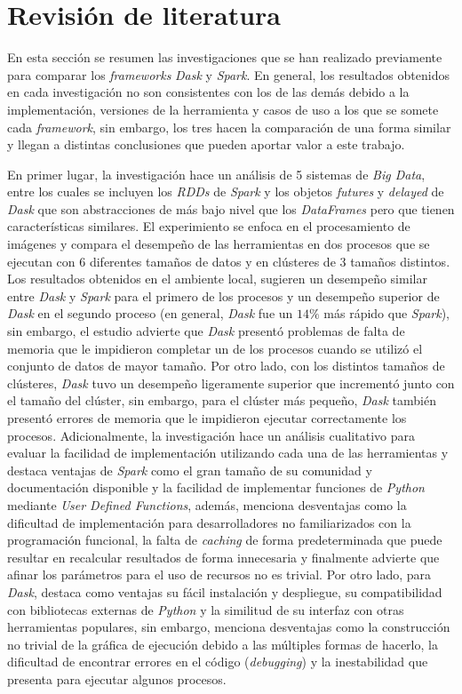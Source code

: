 \chapter{Revisión de literatura}

\noindent En esta sección se resumen las investigaciones que se han realizado previamente para comparar los \textit{frameworks} \textit{Dask} y \textit{Spark}. En general, los resultados obtenidos en cada investigación no son consistentes con los de las demás debido a la implementación, versiones de la herramienta y casos de uso a los que se somete cada \textit{framework}, sin embargo, los tres hacen la comparación de una forma similar y llegan a distintas conclusiones que pueden aportar valor a este trabajo.

En primer lugar, la investigación \cite{comparative-evolution} hace un análisis de 5 sistemas de \textit{Big Data}, entre los cuales se incluyen los \textit{RDDs} de \textit{Spark} y los objetos \textit{futures} y \textit{delayed} de \textit{Dask} que son abstracciones de más bajo nivel que los \textit{DataFrames} pero que tienen características similares. El experimiento se enfoca en el procesamiento de imágenes y compara el desempeño de las herramientas en dos procesos que se ejecutan con 6 diferentes tamaños de datos y en clústeres de 3 tamaños distintos. Los resultados obtenidos en el ambiente local, sugieren un desempeño similar entre \textit{Dask} y \textit{Spark} para el primero de los procesos y un desempeño superior de \textit{Dask} en el segundo proceso (en general, \textit{Dask} fue un $14\%$ más rápido que \textit{Spark}), sin embargo, el estudio advierte que \textit{Dask} presentó problemas de falta de memoria que le impidieron completar un de los procesos cuando se utilizó el conjunto de datos de mayor tamaño. Por otro lado, con los distintos tamaños de clústeres, \textit{Dask} tuvo un desempeño ligeramente superior que incrementó junto con el tamaño del clúster, sin embargo, para el clúster más pequeño, \textit{Dask} también presentó errores de memoria que le impidieron ejecutar correctamente los procesos. Adicionalmente, la investigación hace un análisis cualitativo para evaluar la facilidad de implementación utilizando cada una de las herramientas y destaca ventajas de \textit{Spark} como el gran tamaño de su comunidad y documentación disponible y la facilidad de implementar funciones de \textit{Python} mediante \textit{User Defined Functions}, además, menciona desventajas como la dificultad de implementación para desarrolladores no familiarizados con la programación funcional, la falta de \textit{caching} de forma predeterminada que puede resultar en recalcular resultados de forma innecesaria y finalmente advierte que afinar los parámetros para el uso de recursos no es trivial. Por otro lado, para \textit{Dask}, destaca como ventajas su fácil instalación y despliegue, su compatibilidad con bibliotecas externas de \textit{Python} y la similitud de su interfaz con otras herramientas populares, sin embargo, menciona desventajas como la construcción no trivial de la gráfica de ejecución debido a las múltiples formas de hacerlo, la dificultad de encontrar errores en el código (\textit{debugging}) y la inestabilidad que presenta para ejecutar algunos procesos.

